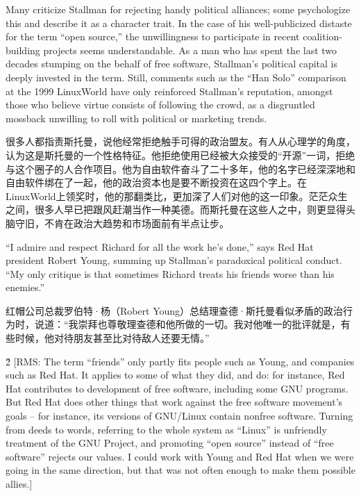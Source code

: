 \ifdefined\eng
Many criticize Stallman for rejecting handy political alliances; some psychologize this and describe it as a character trait. In the case of his well-publicized distaste for the term ``open source,'' the unwillingness to participate in recent coalition-building projects seems understandable. As a man who has spent the last two decades stumping on the behalf of free software, Stallman's political capital is deeply invested in the term. Still, comments such as the ``Han Solo'' comparison at the 1999 LinuxWorld have only reinforced Stallman's reputation, amongst those who believe virtue consists of following the crowd, as a disgruntled mossback unwilling to roll with political or marketing trends.
\fi

\ifdefined\chs
很多人都指责斯托曼，说他经常拒绝触手可得的政治盟友。有人从心理学的角度，认为这是斯托曼的一个性格特征。他拒绝使用已经被大众接受的``开源''一词，拒绝与这个圈子的人合作项目。他为自由软件奋斗了二十多年，他的名字已经深深地和自由软件绑在了一起，他的政治资本也是要不断投资在这四个字上。在LinuxWorld上领奖时，他的那翻类比，更加深了人们对他的这一印象。茫茫众生之间，很多人早已把跟风赶潮当作一种美德。而斯托曼在这些人之中，则更显得头脑守旧，不肯在政治大趋势和市场面前有半点让步。
\fi

\ifdefined\eng
``I admire and respect Richard for all the work he's done,'' says Red Hat president Robert Young, summing up Stallman's paradoxical political conduct. ``My only critique is that sometimes Richard treats his friends worse than his enemies.''
\fi

\ifdefined\chs
红帽公司总裁罗伯特·杨（Robert Young）总结理查德·斯托曼看似矛盾的政治行为时，说道：``我崇拜也尊敬理查德和他所做的一切。我对他唯一的批评就是，有些时候，他对待朋友甚至比对待敌人还要无情。''
\fi

\ifdefined\eng
\ifdefined\v2
[RMS: The term ``friends'' only partly fits people such as Young, and companies such as Red Hat.  It applies to some of what they did, and do: for instance, Red Hat contributes to development of free software, including some GNU programs.  But Red Hat does other things that work against the free software movement's goals -- for instance, its versions of GNU/Linux contain nonfree software.  Turning from deeds to words, referring to the whole system as ``Linux'' is unfriendly treatment of the GNU Project, and promoting ``open source'' instead of ``free software'' rejects our values.  I could work with Young and Red Hat when we were going in the same direction, but that was not often enough to make them possible allies.]
\fi
\fi

